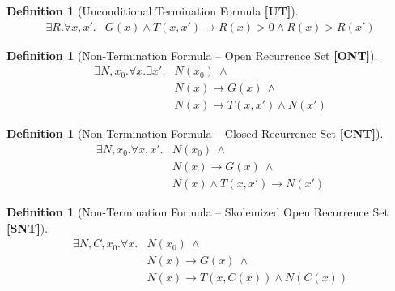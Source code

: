 \documentclass[preprint]{sigplanconf}
\theoremstyle{definition}
\newtheorem{definition}[theorem]{Definition}
\begin{document}
\begin{figure*}
\begin{framed}
\begin{definition}[Unconditional Termination Formula {\bf [UT]}]
\label{def:UT}
\begin{align*}
 \exists R . \forall x, x' . & G(x) \wedge T(x, x') \rightarrow R(x) > 0 \wedge R(x) > R(x')
\end{align*}
\end{definition}

\begin{definition}[Non-Termination Formula -- Open Recurrence Set  {\bf [ONT]}]
\label{def:ont}
 \begin{align*}
  \exists N, x_0 . \forall x . \exists x' . & N(x_0) ~\wedge \\ &  N(x) \rightarrow G(x) ~ \wedge \\
							& N(x) \rightarrow T(x, x') \wedge N(x') 
 \end{align*}
\end{definition}

\begin{definition}[Non-Termination Formula -- Closed Recurrence Set {\bf [CNT]}]
\label{def:cnt}
 \begin{align*}
  \exists N, x_0 . \forall x, x' . & N(x_0) ~ \wedge \\ & N(x) \rightarrow G(x) ~ \wedge \\
							& N(x) \wedge T(x, x') \rightarrow N(x') 
 \end{align*}

\begin{definition}[Non-Termination Formula -- Skolemized Open Recurrence Set  {\bf [SNT]}]
\label{def:snt}
 \begin{align*}
  \exists N, C, x_0 . \forall x . & N(x_0) ~\wedge \\ &  N(x) \rightarrow G(x) ~ \wedge \\
							& N(x) \rightarrow T(x, C(x)) \wedge N(C(x))
 \end{align*}
\end{definition}

\end{definition}


\end{framed}
\caption{Formulae encoding the termination and non-termination of a single loop} \label{fig:single_loop}
\end{figure*}
\end{document}
